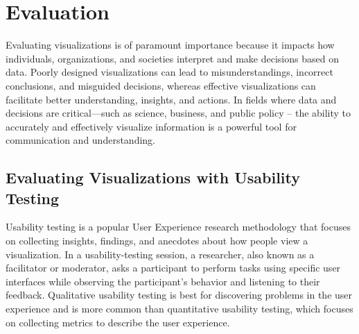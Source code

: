 \chapter{Evaluation}
Evaluating visualizations is of paramount importance because it impacts how individuals, 
organizations, and societies interpret and make decisions based on data. Poorly designed 
visualizations can lead to misunderstandings, incorrect conclusions, and misguided 
decisions, whereas effective visualizations can facilitate better understanding, 
insights, and actions. In fields where data and decisions are critical—such as science, 
business, and public policy -- the ability to accurately and effectively visualize information 
is a powerful tool for communication and understanding.

\section*{Evaluating Visualizations with Usability Testing}
Usability testing is a popular User Experience research methodology that focuses on collecting
insights, findings, and anecdotes about how people view a visualization. In a usability-testing 
session, a researcher, also known as a facilitator or moderator, asks a participant to perform 
tasks using specific user interfaces while observing the participant's behavior and listening to their feedback. 
Qualitative usability testing is best for discovering problems in the user experience and 
is more common than quantitative usability testing, which focuses on collecting metrics to 
describe the user experience.